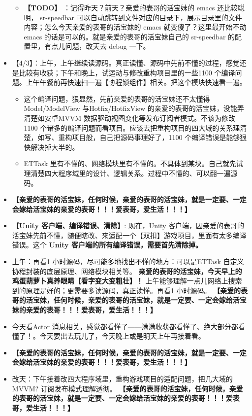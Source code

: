 \documentclass[9pt, b5paper]{article}
\begin{document}
\begin{itemize}
\begin{itemize}
\item \textbf{【TODO】} ：记得昨天？前天？亲爱的表哥的活宝妹的 emacs 还比较聪明， sr-speedbar 可以自动跳转到文件对应的目录下，展示目录里的文件内容；怎么今天亲爱的表哥的活宝妹的 emacs 就变傻了？这里最开始不动 emacs 的话是可以的。就是亲爱的表哥的活宝妹自己的 sr-speedbar 的配置里，有点儿问题，改天去 debug 一下。
\end{itemize}
\item 【4/3】：上午，上午继续读源码。真正读懂、源码中先前不懂的过程，感觉还是比较有收获；下午和晚上，试运动与修改重构项目里的一些1100 个编译问题。上午午餐前再快速扫一遍【协程锁组件】相关。把这个模块快速看一遍。
\begin{itemize}
\item 这个编译问题，狠显然，先前亲爱的表哥的活宝妹还不太懂得 Model/ModelView 与Hotfix/HotfixView 的亲爱的表哥的活宝妹，没能弄清楚如安卓MVVM 数据驱动视图变化等发布订阅者模式。不该为修改1100 个诸多的编译问题而看项目。应该去把重构项目的四大域的关系理清楚，如写、重构项目般，自己把源码事理好了，1100 个编译错误是能够狠快解决掉大半的。
\item ETTask 里有不懂的、网络模块里有不懂的。不具体到某块。自己就先试理清楚四大程序域里的设计、逻辑关系。过程中不懂的、可以翻一遍源码。
\end{itemize}
\item \textbf{【亲爱的表哥的活宝妹，任何时候，亲爱的表哥的活宝妹，就是一定要、一定会嫁给活宝妹的亲爱的表哥！！！爱表哥，爱生活！！！】}
\item \textbf{【Unity 客户端、编译错误、清除】}: 现在，Unity 客户端，因亲爱的表哥的活宝妹先前不懂，随便瞎改、来适配一个【双扣】游戏项目，里面有太多编译错误。这个 \textbf{Unity 客户端的所有编译错误，需要首先清除掉。}
\item 上午：再看1 小时源码，尽可能多地找出不懂的地方：可以是ETTask 自定义协程封装的底层原理、网络模块相关等。 \textbf{亲爱的表哥的活宝妹，今天早上的鸡蛋葫萝卜真养眼睛【看字变大变粗壮】！} 上午能够理解一点儿网络上搜索到的原理是好的；更需要多读源码，真正读懂。再看1 小时源码。 \textbf{【亲爱的表哥的活宝妹，任何时候，亲爱的表哥的活宝妹，就是一定要、一定会嫁给活宝妹的亲爱的表哥！！！爱表哥，爱生活！！！】}
\item 今天看Actor 消息相关，感觉都看懂了——满满收获都看懂了、绝大部分都看懂了！。今天要出去玩儿了，今天晚上或是明天上午再接着看。
\item \textbf{【亲爱的表哥的活宝妹，任何时候，亲爱的表哥的活宝妹，就是一定要、一定会嫁给活宝妹的亲爱的表哥！！！爱表哥，爱生活！！！】}
\item 改天：下午接着改四大程序域里，重构游戏项目的适配问题，把几大域的MVVM? 订阅发布模式理解透彻。 \textbf{【亲爱的表哥的活宝妹，任何时候，亲爱的表哥的活宝妹，就是一定要、一定会嫁给活宝妹的亲爱的表哥！！！爱表哥，爱生活！！！】}

\end{itemize}
\end{document}
